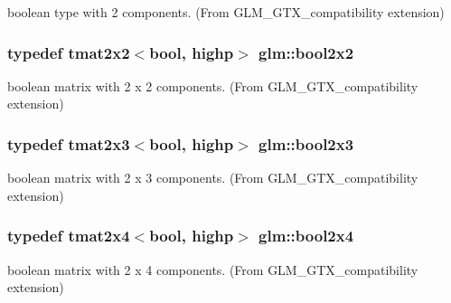 boolean type with 2 components. (From G\+L\+M\+\_\+\+G\+T\+X\+\_\+compatibility extension) 

\hypertarget{group__gtx__compatibility_gaeb49db4b236907ba11f5b9117274b5d8}{}
\subsubsection[{bool2x2}]{\setlength{\rightskip}{0pt plus 5cm}typedef tmat2x2$<$bool, highp$>$ {\bf glm\+::bool2x2}}\label{group__gtx__compatibility_gaeb49db4b236907ba11f5b9117274b5d8}


boolean matrix with 2 x 2 components. (From G\+L\+M\+\_\+\+G\+T\+X\+\_\+compatibility extension) 

\hypertarget{group__gtx__compatibility_ga2d7e2c79179868a41d1f9f7a63f2ae52}{}
\subsubsection[{bool2x3}]{\setlength{\rightskip}{0pt plus 5cm}typedef tmat2x3$<$bool, highp$>$ {\bf glm\+::bool2x3}}\label{group__gtx__compatibility_ga2d7e2c79179868a41d1f9f7a63f2ae52}


boolean matrix with 2 x 3 components. (From G\+L\+M\+\_\+\+G\+T\+X\+\_\+compatibility extension) 

\hypertarget{group__gtx__compatibility_gacbd1c62dfad23155dba803d7c5125288}{}
\subsubsection[{bool2x4}]{\setlength{\rightskip}{0pt plus 5cm}typedef tmat2x4$<$bool, highp$>$ {\bf glm\+::bool2x4}}\label{group__gtx__compatibility_gacbd1c62dfad23155dba803d7c5125288}


boolean matrix with 2 x 4 components. (From G\+L\+M\+\_\+\+G\+T\+X\+\_\+compatibility extension) 

